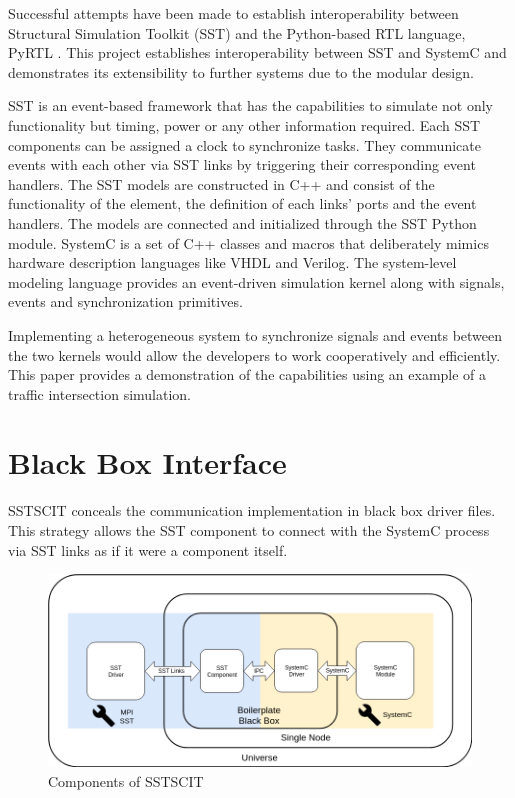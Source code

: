 \documentclass{article}
\begin{document}
  Successful attempts have been made to establish interoperability between Structural Simulation
  Toolkit (SST) and the Python-based RTL language, PyRTL \cite{pyrtl-sst}. This project establishes
  interoperability between SST and SystemC and demonstrates its extensibility to further systems due
  to the modular design.

  SST is an event-based framework that has the capabilities to simulate not only functionality but
  timing, power or any other information required. Each SST components can be assigned a clock to
  synchronize tasks. They communicate events with each other via SST links by triggering their
  corresponding event handlers. The SST models are constructed in C++ and consist of the
  functionality of the element, the definition of each links' ports and the event handlers. The
  models are connected and initialized through the SST Python module. SystemC is a set of C++
  classes and macros that deliberately mimics hardware description languages like VHDL and Verilog.
  The system-level modeling language provides an event-driven simulation kernel along with signals,
  events and synchronization primitives.

  Implementing a heterogeneous system to synchronize signals and events between the two kernels
  would allow the developers to work cooperatively and efficiently. This paper provides a
  demonstration of the capabilities using an example of a traffic intersection simulation.

  \section{Black Box Interface}
  SSTSCIT conceals the communication implementation in black box driver files. This strategy allows
  the SST component to connect with the SystemC process via SST links as if it were a component
  itself.

  \begin{figure}[!h]
    \centering
    \includegraphics[width=6.5in]{diagrams/comm.png}
    \caption{Components of SSTSCIT}
    \label{fig:comm}
  \end{figure}
\end{document}
